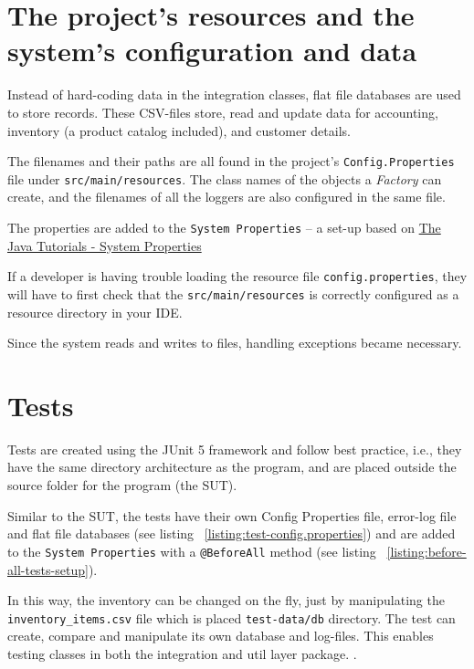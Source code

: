 \documentclass[a4paper]{scrreprt}
\begin{document}
\section*{The project's resources and the system's configuration and data}
Instead of hard-coding data in the integration classes,
flat file databases are used to store records.
These CSV-files store,
read and update data for accounting, inventory (a product catalog included), and customer details.

The filenames and their paths are all found in the project's \verb|Config.Properties|
file under \verb|src/main/resources|.
The class names of the objects a \emph{Factory} can create, and the filenames of all the loggers are also
configured in the same file.

The properties are added to the \verb|System Properties| -- a set-up based on
\href{https://docs.oracle.com/javase/tutorial/essential/environment/sysprop.html}{The Java\texttrademark{} Tutorials - System Properties}

If a developer is having trouble loading the resource file \verb|config.properties|,
they will have to first check that the \verb|src/main/resources|
is correctly configured as a resource directory in your IDE.

Since the system reads and writes to files, handling exceptions became necessary.

\section*{Tests}
Tests are created using the JUnit 5 framework and follow best practice, i.e., they
have the same directory architecture as the program, and are placed outside the source
folder for the program (the SUT).

Similar to the SUT, the tests have their own Config Properties file, error-log file and flat file databases
(see listing ~\ref{listing:test-config.properties}) and are added to the \verb|System Properties| with
a \texttt{@BeforeAll} method (see listing ~\ref{listing:before-all-tests-setup}).

In this way, the inventory can be changed on the fly, just by manipulating
the \verb|inventory_items.csv| file which is placed \verb|test-data/db| directory.
The test can create, compare and manipulate its own database and log-files.
This enables testing classes in both the integration and util layer package.
. %
\end{document}
